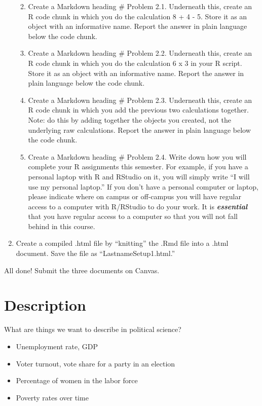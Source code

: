 \documentclass[
  letterpaper,
  DIV=11,
  numbers=noendperiod]{scrreprt}
\providecommand{\tightlist}{%
  \setlength{\itemsep}{0pt}\setlength{\parskip}{0pt}}\usepackage{longtable,booktabs,array}
\begin{document}
\begin{enumerate}
  \begin{enumerate}
  \def\labelenumii{\arabic{enumii}.}
  \tightlist
  \item
    Create a Markdown heading \# Problem 2.1. Underneath this, create an
    R code chunk in which you do the calculation 8 + 4 - 5. Store it as
    an object with an informative name. Report the answer in plain
    language below the code chunk.
  \item
    Create a Markdown heading \# Problem 2.2. Underneath this, create an
    R code chunk in which you do the calculation 6 x 3 in your R script.
    Store it as an object with an informative name. Report the answer in
    plain language below the code chunk.
  \item
    Create a Markdown heading \# Problem 2.3. Underneath this, create an
    R code chunk in which you add the previous two calculations
    together. Note: do this by adding together the objects you created,
    not the underlying raw calculations. Report the answer in plain
    language below the code chunk.
  \item
    Create a Markdown heading \# Problem 2.4. Write down how you will
    complete your R assignments this semester. For example, if you have
    a personal laptop with R and RStudio on it, you will simply write
    ``I will use my personal laptop.'' If you don't have a personal
    computer or laptop, please indicate where on campus or off-campus
    you will have regular access to a computer with R/RStudio to do your
    work. It is \textbf{\emph{essential}} that you have regular access
    to a computer so that you will not fall behind in this course.
  \end{enumerate}
\item
  Create a compiled .html file by ``knitting'' the .Rmd file into a
  .html document. Save the file as ``LastnameSetup1.html.''
\end{enumerate}

All done! Submit the three documents on Canvas.


\hypertarget{description}{%
\chapter{Description}\label{description}}

What are things we want to describe in political science?

\begin{itemize}
\tightlist
\item
  Unemployment rate, GDP
\item
  Voter turnout, vote share for a party in an election
\item
  Percentage of women in the labor force
\item
  Poverty rates over time
\end{itemize}
\end{document}
